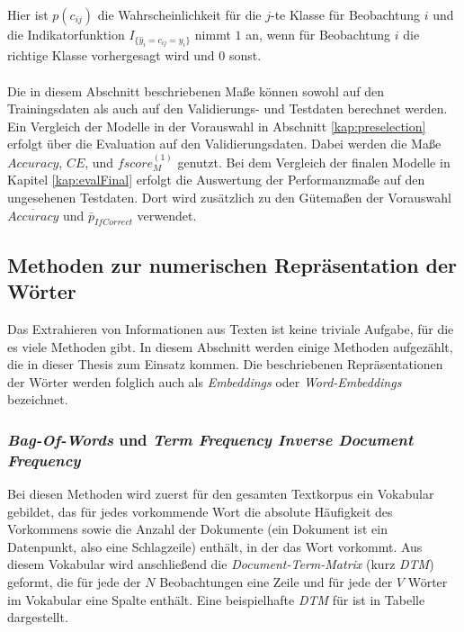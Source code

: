 \documentclass[a4paper,11pt]{article}
\begin{document}
Hier ist $p(c_{ij})$ die Wahrscheinlichkeit für die $j$-te Klasse für Beobachtung $i$ und die Indikatorfunktion $I_{\{\hat{y}_i = c_{ij} = y_i\}}$ nimmt $1$ an, wenn für Beobachtung $i$ die richtige Klasse vorhergesagt wird und $0$ sonst.\\
\\
Die in diesem Abschnitt beschriebenen Maße können sowohl auf den Trainingsdaten als auch auf den  Validierungs- und Testdaten berechnet werden. Ein Vergleich der Modelle in der Vorauswahl in Abschnitt \ref{kap:preselection} erfolgt über die Evaluation auf den Validierungsdaten. Dabei werden die Maße $Accuracy$, $CE$, und $fscore_M^{(1)}$ genutzt.
Bei dem Vergleich der finalen Modelle in Kapitel \ref{kap:evalFinal} erfolgt die Auswertung der Performanzmaße auf den ungesehenen Testdaten. Dort wird zusätzlich zu den Gütemaßen der Vorauswahl $\overline{Accuracy}$ und $\bar{p}_{IfCorrect}$ verwendet.


\subsection{Methoden zur numerischen Repräsentation der Wörter} \label{kap:3.1Wordemb}

Das Extrahieren von Informationen aus Texten ist keine triviale Aufgabe, für die es viele Methoden gibt. In diesem Abschnitt werden einige Methoden aufgezählt, die in dieser Thesis zum Einsatz kommen.
Die beschriebenen Repräsentationen der Wörter werden folglich auch als \textit{Embeddings} oder \textit{Word-Embeddings} bezeichnet.


\subsubsection{\textit{Bag-Of-Words} und \textit{Term Frequency Inverse Document Frequency}} \label{Kap:Tfidf}

Bei diesen Methoden wird zuerst für den gesamten Textkorpus ein Vokabular gebildet, das für jedes vorkommende Wort die absolute Häufigkeit des Vorkommens sowie die Anzahl der Dokumente (ein Dokument ist ein Datenpunkt, also eine Schlagzeile) enthält, in der das Wort vorkommt. Aus diesem Vokabular wird anschließend die \textit{Document-Term-Matrix} (kurz \textit{DTM}) geformt, die für jede der $N$ Beobachtungen eine Zeile und für jede der $V$ Wörter im Vokabular eine Spalte enthält. Eine beispielhafte \textit{DTM} für ist in Tabelle dargestellt.
\end{document}

